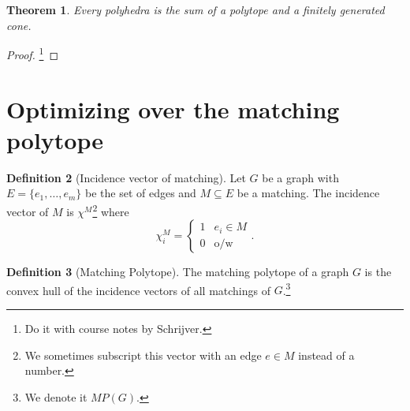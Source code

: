 \documentclass{tufte-handout}
\newtheorem{thm}{Theorem}
\theoremstyle{definition}
\newtheorem{defn}[thm]{Definition}
\theoremstyle{remark}
\begin{document}
\begin{thm}
	Every polyhedra is the sum of a polytope and a finitely generated cone.
\end{thm}
\begin{proof}
	\footnote{Do it with course notes by Schrijver.}
\end{proof}


\section{Optimizing over the matching polytope}
\begin{defn}[Incidence vector of matching]
	Let $G$ be a graph with $E= \{e_1, \dots, e_m\}$ be the set of edges and $M \subseteq E$ be a matching. The incidence vector of $M$ is $\chi^M$\footnote{We sometimes subscript this vector with an edge $e \in M$ instead of a number.} where
	$$\chi^M_i = \begin{cases}1 &e_i \in M\\0 & \text{o/w}\end{cases}.$$
\end{defn}

\begin{defn}[Matching Polytope]
	The matching polytope of a graph $G$ is the convex hull of the incidence vectors of all matchings of $G$.\footnote{We denote it $MP(G)$.}
\end{defn}
\end{document}
